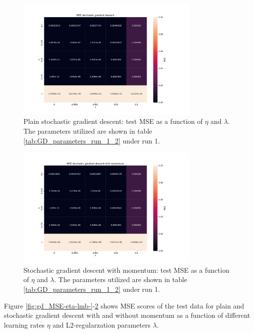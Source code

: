 \begin{figure}[H]
\centering
\includegraphics[width=0.8\textwidth]{Figures/PartA/sgd_MSE(eta,lmb)}
\caption{Plain stochastic gradient descent: test MSE as a function of \(\eta \) and \(\lambda \).
 The parameters utilized are shown in table \ref{tab:GD_parameters_run_1_2} under run 1.}
\label{fig:sgd_MSE-eta-lmb-}
\end{figure}

\begin{figure}[H]
\centering
\includegraphics[width=0.8\textwidth]{Figures/PartA/sgdm_MSE(eta,lmb)}
\caption{Stochastic gradient descent with momentum: test MSE as a function of \(\eta \) and \(\lambda \).
 The parameters utilized are shown in table \ref{tab:GD_parameters_run_1_2} under run 1.}
\label{fig:sgdm_MSE-eta-lmb-}
\end{figure}

Figure \ref{fig:gd_MSE-eta-lmb-}-\ref{fig:sgdm_MSE-eta-lmb-} shows MSE scores of the test data for 
plain and stochastic gradient descent with and without momentum as a function of
different learning rates \(\eta \) and L2-regularzation parameters \(\lambda \). 



